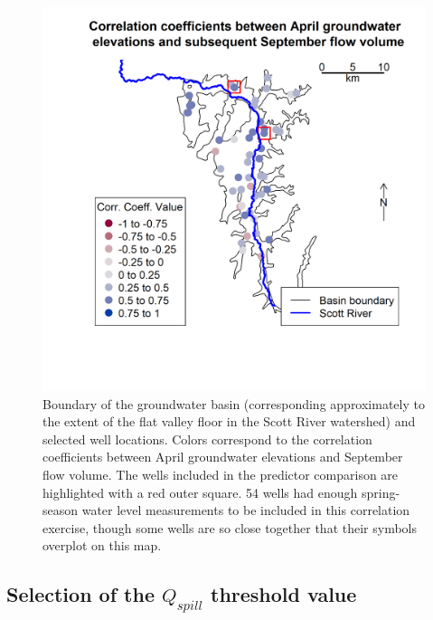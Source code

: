 \documentclass[hess, manuscript]{copernicus}
\begin{document}
\begin{figure}
\includegraphics[width=1\linewidth]{f09} \caption{\label{fig:gw_vs_fall_flows_corr_map} Boundary of the groundwater basin (corresponding approximately to the extent of the flat valley floor in the Scott River watershed) and selected well locations. Colors correspond to the correlation coefficients between April groundwater elevations and September flow volume. The wells included in the predictor comparison are highlighted with a red outer square. 54 wells had enough spring-season water level measurements to be included in this correlation exercise, though some wells are so close together that their symbols overplot on this map.}\label{fig:gw_vs_fall_flows_corr_map}
\end{figure}

\newpage

\subsection{\texorpdfstring{Selection of the \(Q_{spill}\) threshold
value}{Selection of the Q\_\{spill\} threshold value}}
\end{document}
